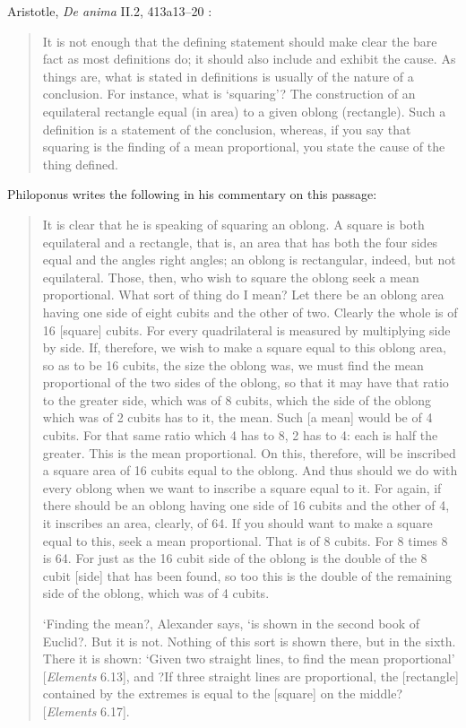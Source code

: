 \documentclass{article}
\begin{document}
Aristotle, {\em De anima} II.2, 413a13--20 \cite[p.~191]{aristotle}:

\begin{quote}
It is not enough that the defining statement should make clear
the bare fact as most definitions do; it should also include and
exhibit the cause. As things are, what is stated in definitions is
usually of the nature of a conclusion. For instance, what is 
`squaring'? The construction of an equilateral rectangle equal (in area)
to a given oblong (rectangle). Such a definition is a statement of
the conclusion, whereas, if you say that squaring is the finding of
a mean proportional, you state the cause of the thing defined.
\end{quote}

Philoponus \cite[p.~34]{philoponus1} writes the following in his commentary on this passage:

\begin{quote}
It is clear that he is speaking of squaring an oblong. A square is both equilateral and a rectangle, that is, an area that has both the four sides equal and the angles right angles; an oblong is rectangular, indeed, but not equilateral. Those, then, who wish to square the oblong seek a mean proportional. What sort of thing do I mean? Let there be an oblong area having one side of eight cubits and the other of two. Clearly the whole is of 16 [square] cubits. For every quadrilateral is measured by multiplying side by side. If, therefore, we wish to
make a square equal to this oblong area, so as to be 16 cubits, the size the oblong was, we must find the mean proportional of the two sides of the oblong, so that it may have that ratio to the greater side, which was of 8 cubits, which the side of the oblong which was of 2 cubits has to it, the mean. Such [a mean] would be of 4 cubits. For that same ratio which 4 has to 8, 2 has to 4: each is half the greater. This is the mean proportional. On this, therefore, will be inscribed a square area of 16 cubits equal to the oblong. And thus should we do with every oblong when we want to inscribe a square equal to it. For again, if there should be an oblong having one side of 16 cubits and the other of 4, it inscribes an area, clearly, of 64. If you should want to make a square equal to this, seek a mean proportional. That is of 8 cubits. For 8 times 8 is 64. For just as the 16 cubit side of the oblong is the double of the 8 cubit [side] that has been found, so too this is the double of the remaining side of the oblong, which was of 4 cubits.

`Finding the mean?, Alexander says, `is shown in the second book of Euclid?. But it is not. Nothing of this sort is shown there, but in the sixth. There it is shown: `Given two straight lines, to find the mean proportional' [{\em Elements} 6.13], and ?If three straight lines are proportional, the [rectangle] contained by the extremes is equal to the
[square] on the middle? [{\em Elements} 6.17].
\end{quote}
\end{document}
